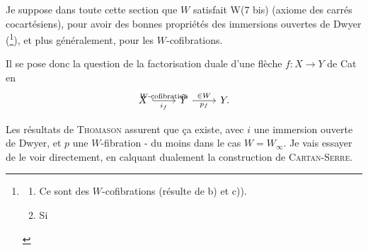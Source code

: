 \documentclass[11pt]{article}
\newcommand{\printedpage}[1]{\marginpar{\footnotesize p.~#1}}
\newcommand{\msp}[1]{\marginpar{\footnotesize [#1]}}
\begin{document}
\marginpar{\textbar\textbar\textbar}Je suppose dans toute cette section que $W$ satisfait W(7 bis) (axiome des carrés cocartésiens), pour avoir des bonnes propriétés des immersions ouvertes de Dwyer (\footnote[124]{\begin{enumerate}
\item[a)] Ce sont des $W$-cofibrations (résulte de b) et c)).
\item[b)] Si
\end{enumerate}}), et plus généralement, pour les $W$-cofibrations. %

\printedpage{145}

\msp{page 228}
Il se pose donc la question de la factorisation duale d'une flèche $f : X \longrightarrow Y$ de Cat en
\[
\begin{tikzcd}
X \arrow[r, hook, "W\text{-cofibration}", "i_f"'] & \tilde{Y} \arrow[r, "\in W", "p_f"'] & Y.
\end{tikzcd}
\]

Les résultats de \textsc{Thomason} assurent que ça existe, avec $i$ une immersion ouverte de Dwyer, et $p$ une $W$-fibration - du moins dans le cas $W = W_\infty$. Je vais essayer de le voir directement, en calquant dualement la construction de \textsc{Cartan-Serre}.
\end{document}
